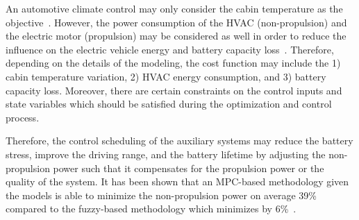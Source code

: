An automotive climate control may only consider the cabin temperature as the objective~\cite{AF_30,AF_31,AF_32,AF_33}. However, the power consumption of the HVAC (non-propulsion) and the electric motor (propulsion) may be considered as well in order to reduce the influence on the electric vehicle energy and battery capacity loss~\cite{AF_10,AF_29}. Therefore, depending on the details of the modeling, the cost function may include the 1) cabin temperature variation, 2) HVAC energy consumption, and 3) battery capacity loss. Moreover, there are certain constraints on the control inputs and state variables which should be satisfied during the optimization and control process.

Therefore, the control scheduling of the auxiliary systems may reduce the battery stress, improve the driving range, and the battery lifetime by adjusting the non-propulsion power such that it compensates for the propulsion power or the quality of the system. It has been shown that an MPC-based methodology given the models is able to minimize the non-propulsion power on average 39\% compared to the fuzzy-based methodology which minimizes by 6\%~\cite{AF_10,AF_32,AF_43}.


